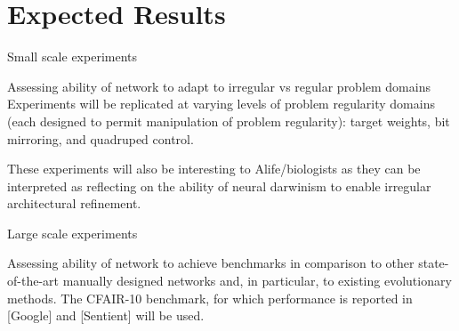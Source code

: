 \section{Expected Results}

Small scale experiments

Assessing ability of network to adapt to irregular vs regular problem domains
Experiments will be replicated at varying levels of problem regularity  domains (each designed to permit manipulation of problem regularity): target weights, bit mirroring, and quadruped control.\autocite{Clune2011OnRegularity}

These experiments will also be interesting to Alife/biologists as they can be interpreted as reflecting on the ability of neural darwinism to enable irregular architectural refinement.

Large scale experiments

Assessing ability of network to achieve benchmarks in comparison to other state-of-the-art manually designed networks and, in particular, to existing evolutionary methods.
The CFAIR-10 benchmark, for which performance is reported in [Google] and [Sentient] will be used.
